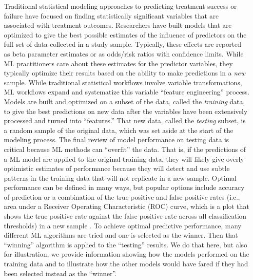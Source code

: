 \documentclass[
  number,
  preprint,
  3p,
  onecolumn]{elsarticle}
\begin{document}
Traditional statistical modeling approaches to predicting treatment
success or failure have focused on finding statistically significant
variables that are associated with treatment outcomes. Researchers have
built models that are optimized to give the best possible estimates of
the influence of predictors on the full set of data collected in a study
sample. Typically, these effects are reported as beta parameter
estimates or as odds/risk ratios with confidence limits. While ML
practitioners care about these estimates for the predictor variables,
they typically optimize their results based on the ability to make
predictions in a \emph{new} sample. While traditional statistical
workflows involve variable transformations, ML workflows expand and
systematize this variable ``feature engineering'' process. Models are
built and optimized on a subset of the data, called the \emph{training}
data, to give the best predictions on new data after the variables have
been extensively processed and turned into ``features.'' That new data,
called the \emph{testing} subset, is a random sample of the original
data, which was set aside at the start of the modeling process. The
final review of model performance on testing data is critical because ML
methods can ``overfit'' the data. That is, if the predictions of a ML
model are applied to the original training data, they will likely give
overly optimistic estimates of performance because they will detect and
use subtle patterns in the training data that will not replicate in a
new sample. Optimal performance can be defined in many ways, but popular
options include accuracy of prediction or a combination of the true
positive and false positive rates (i.e., area under a Receiver Operating
Characteristic (ROC) curve, which is a plot that shows the true positive
rate against the false positive rate across all classification
thresholds) in a new sample
\citep{james2021a, fawcett2006, bradley1997}. To achieve optimal
predictive performance, many different ML algorithms are tried and one
is selected as the winner. Then that ``winning'' algorithm is applied to
the ``testing'' results. We do that here, but also for illustration, we
provide information showing how the models performed on the training
data and to illustrate how the other models would have fared if they had
been selected instead as the ``winner''.
\end{document}
